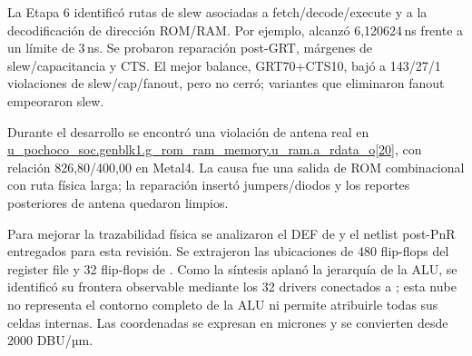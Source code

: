 \documentclass[11pt,a4paper]{article}
\newcommand{\ruta}[1]{\protect\path{#1}}
\newcommand{\ns}{\,ns}
\begin{document}
La Etapa 6 identificó rutas de slew asociadas a fetch/decode/execute y a la decodificación de dirección ROM/RAM. Por ejemplo, \ruta{_3648_} alcanzó 6,120624\ns{} frente a un límite de 3\ns{}. Se probaron reparación post-GRT, márgenes de slew/capacitancia y CTS. El mejor balance, GRT70+CTS10, bajó a 143/27/1 violaciones de slew/cap/fanout, pero no cerró; variantes que eliminaron fanout empeoraron slew.

Durante el desarrollo se encontró una violación de antena real en \url{u_pochoco_soc.genblk1.g_rom_ram_memory.u_ram.a_rdata_o[20]}, con relación 826,80/400,00 en Metal4. La causa fue una salida de ROM combinacional con ruta física larga; la reparación insertó jumpers/diodos y los reportes posteriores de antena quedaron limpios.

Para mejorar la trazabilidad física se analizaron el DEF de \ruta{asic_top} y el netlist post-PnR entregados para esta revisión. Se extrajeron las ubicaciones de 480 flip-flops del register file y 32 flip-flops de \ruta{cycle_q}. Como la síntesis aplanó la jerarquía de la ALU, se identificó su frontera observable mediante los 32 drivers conectados a \ruta{a_addr_i}; esta nube no representa el contorno completo de la ALU ni permite atribuirle todas sus celdas internas. Las coordenadas se expresan en micrones y se convierten desde 2000 DBU/µm.
\end{document}

